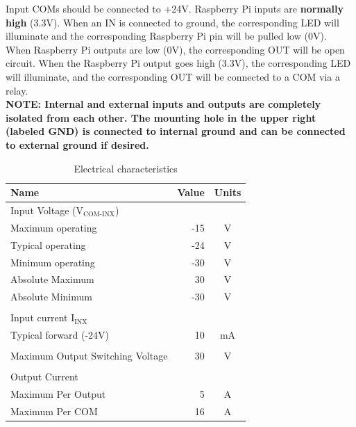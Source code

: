 \documentclass{article}
\begin{document}
Input COMs should be connected to +24V. Raspberry Pi inputs are \textbf{normally high} (3.3V). When an IN is connected to ground, the corresponding LED will illuminate and the corresponding Raspberry Pi pin will be pulled low (0V).\\

When Raspberry Pi outputs are low (0V), the corresponding OUT will be open circuit. When the Raspberry Pi output goes high (3.3V), the corresponding LED will illuminate, and the corresponding OUT will be connected to a COM via a relay.\\

\textbf{
NOTE: Internal and external inputs and outputs are completely isolated from each other. The mounting hole in the upper right (labeled GND) is connected to internal ground and can be connected to external ground if desired.}\\


\begin{table}[h!]
\centering
    \begin{tabular}{|l|r|c|}
    \hline
    Name  & Value & Units   \\ \hline
    Input Voltage ($\text{V}_{\text{COM-INX}}$)  &  &    \\ \hline
    Maximum operating & -15 & V\\ \hline
    Typical operating & -24 & V \\ \hline
    Minimum operating & -30 & V \\ \hline
    Absolute Maximum &  30 & V \\ \hline
    Absolute Minimum & -30 & V \\ \hline
    & & \\ \hline
    Input current $\text{I}_\text{INX}$ & & \\ \hline
    Typical forward (-24V) & 10 & mA \\ \hline
    & & \\ \hline
    Maximum Output Switching Voltage & 30 & V \\ \hline
    & & \\ \hline
    Output Current & & \\ \hline
    Maximum Per Output & 5 & A \\ \hline 
    Maximum Per COM & 16 & A \\ \hline

    \end{tabular}
\caption{Electrical characteristics}
\label{table:elec_char}
\end{table} 
\end{document}
